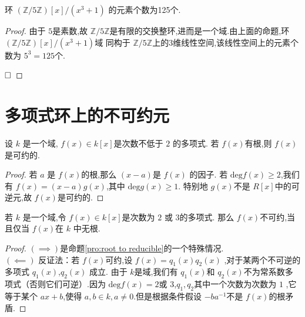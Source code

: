 \documentclass[lang=cn,12pt,color=green,fontset=none,pad]{elegantbook}
\begin{document}
\begin{example}
    环 $ \left( \mathbb{Z} /5\mathbb{Z}      \right)[x]/\left( x^{3}+ 1 \right)   $ 的元素个数为125个.
\end{example}

\begin{proof}
    由于 $ 5 $是素数,故 $ \mathbb{Z} /5\mathbb{Z}  $是有限的交换整环,进而是一个域.由上面的命题,环 $ \left( \mathbb{Z} /5\mathbb{Z}  \right)[x]/\left( x^{3}+ 1 \right)   $域 同构于 $ \mathbb{Z} /5\mathbb{Z}  $上的3维线性空间,该线性空间上的元素个数为 $ 5^{3}=125 $个. 

    $\hfill\square$
\end{proof}

\section{多项式环上的不可约元}

\begin{proposition}\label{pro:root to reducible}
    设 $ k $ 是一个域, $ f\left( x \right)  \in  k[x] $是次数不低于 $ 2 $ 的多项式.
    若 $ f\left( x \right)  $有根,则 $ f\left( x \right)  $是可约的.   
\end{proposition}

\begin{proof}
    若 $ a $ 是 $ f\left( x \right)  $的根,那么 $ \left( x-a \right)  $是 $ f\left( x \right)  $   的因子.
    若 $ \mathrm{deg} f\left( x \right) \ge 2 $,我们有 $f\left( x \right) =\left( x-a \right) g\left( x \right)  $,其中 $ \mathrm{deg}g\left( x \right) \ge 1  $.
    特别地 $ g\left( x \right)  $不是 $ R[x] $中的可逆元,故 $ f\left( x \right)  $是可约的.      
\end{proof}

\begin{proposition}
    若 $ k $ 是一个域,令 $ f\left( x \right)  \in k[x] $是次数为 $ 2 $ 或 $ 3 $的多项式.
    那么 $ f\left( x \right)  $不可约,当且仅当 $ f\left( x \right)  $在 $ k $ 中无根.    
\end{proposition}
\begin{proof}
    $ \left( \implies \right)  $是命题\ref{pro:root to reducible}的一个特殊情况.\\ 
     
    $ \left(\impliedby \right)  $ 反证法：若 $ f\left( x \right)  $可约,设 $ f\left( x \right) =q_1\left( x \right) q_2\left( x \right)  $   ,对于某两个不可逆的多项式 $ q_1\left( x \right)  $,$ q_2\left( x \right)  $  成立.
    由于 $ k $是域,我们有 $ q_1\left( x \right)  $和 $ q_2\left( x \right)  $不为常系数多项式（否则它们可逆）.因为 $ \mathrm{deg}f\left( x \right) = 2  $或 $ 3 $,$ q_1,q_2 $其中一个次数为次数为 $ 1 $ ,它等于某个
    $ ax+ b  $,使得 $ a,b \in k    ,a \neq  0 $.但是根据条件假设 $ -b a^{-1}  $不是 $ f\left( x \right)  $的根矛盾.          
\end{proof}
\end{document}
